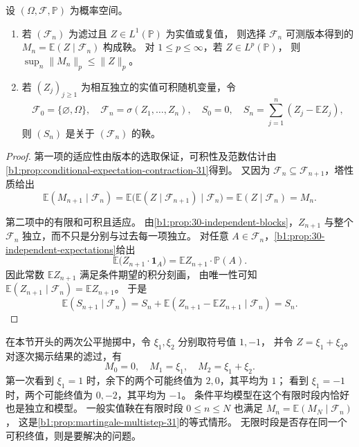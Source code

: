 \begin{proposition}[条件平均与中心化独立和]
\label{b1:prop:martingale-models-31}
设 \((\Omega,\mathcal F,\mathbb P)\) 为概率空间。
\begin{enumerate}
 \item\label{b1:item:conditional-average-martingale-31}
 若 \((\mathcal F_n)\) 为滤过且 \(Z\in L^1(\mathbb P)\) 为实值或复值，
 则选择 \(\mathcal F_n\) 可测版本得到的
 \(M_n=\mathbb E(Z\mid\mathcal F_n)\) 构成鞅。
 对 \(1\leq p\leq\infty\)，若 \(Z\in L^p(\mathbb P)\)，
 则 \(\sup_n\|M_n\|_p\leq\|Z\|_p\)。
 \item\label{b1:item:independent-sum-martingale-31}
 若 \((Z_j)_{j\geq1}\) 为相互独立的实值可积随机变量，令
 \[
  \mathcal F_0=\{\varnothing,\Omega\},\quad
  \mathcal F_n=\sigma(Z_1,\ldots,Z_n),\quad
  S_0=0,\quad S_n=\sum_{j=1}^n(Z_j-\mathbb E Z_j),
 \]
 则 \((S_n)\) 是关于 \((\mathcal F_n)\) 的鞅。
\end{enumerate}
\end{proposition}
\begin{proof}
第一项的适应性由版本的选取保证，可积性及范数估计由%
\cref{b1:prop:conditional-expectation-contraction-31}得到。
又因为 \(\mathcal F_n\subseteq\mathcal F_{n+1}\)，塔性质给出
\[
 \mathbb E(M_{n+1}\mid\mathcal F_n)
 =\mathbb E\bigl(\mathbb E(Z\mid\mathcal F_{n+1})\mid\mathcal F_n\bigr)
 =\mathbb E(Z\mid\mathcal F_n)=M_n.
\]

第二项中的有限和可积且适应。
由\cref{b1:prop:30-independent-blocks}，\(Z_{n+1}\) 与整个
\(\mathcal F_n\) 独立，而不只是分别与过去每一项独立。
对任意 \(A\in\mathcal F_n\)，\cref{b1:prop:30-independent-expectations}给出
\[
 \mathbb E\bigl(Z_{n+1}\cdot\mathbf1_A\bigr)
 =\mathbb E Z_{n+1}\cdot\mathbb P(A).
\]
因此常数 \(\mathbb E Z_{n+1}\) 满足条件期望的积分刻画，
由唯一性可知 \(\mathbb E(Z_{n+1}\mid\mathcal F_n)=\mathbb E Z_{n+1}\)。
于是
\[
 \mathbb E(S_{n+1}\mid\mathcal F_n)
 =S_n+\mathbb E(Z_{n+1}-\mathbb E Z_{n+1}\mid\mathcal F_n)=S_n.
\]
\end{proof}

在本节开头的两次公平抛掷中，令 \(\xi_1,\xi_2\) 分别取符号值 \(1,-1\)，
并令 \(Z=\xi_1+\xi_2\)。对逐次揭示结果的滤过，有
\[
 M_0=0,\quad M_1=\xi_1,\quad M_2=\xi_1+\xi_2.
\]
第一次看到 \(\xi_1=1\) 时，余下的两个可能终值为 \(2,0\)，其平均为 \(1\)；
看到 \(\xi_1=-1\) 时，两个可能终值为 \(0,-2\)，其平均为 \(-1\)。
条件平均模型在这个有限时段内恰好也是独立和模型。
一般实值鞅在有限时段 \(0\leq n\leq N\) 也满足
\(M_n=\mathbb E(M_N\mid\mathcal F_n)\)，
这是\cref{b1:prop:martingale-multistep-31}的等式情形。
无限时段是否存在同一个可积终值，则是要解决的问题。

